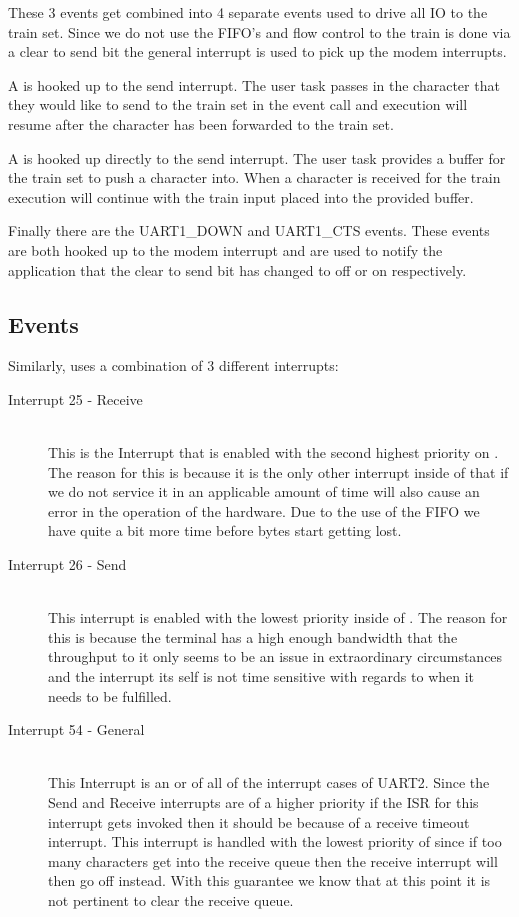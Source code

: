 \documentclass[pdftex,10pt,a4paper]{article}
\begin{document}
These 3 events get combined into 4 separate events used to drive all IO to the
train set. Since we do not use the FIFO's and flow control to the train is done
via a clear to send bit the general interrupt is used to pick up the modem
interrupts.

A  is hooked up to the  send interrupt. The user
task passes in the character that they would like to send to the train set
in the event call and execution will resume after the character has been
forwarded to the train set.

A  is hooked up directly to the  send interrupt.
The user task provides a buffer for the train set to push a character into.
When a character is received for the train execution will continue with the
train input placed into the provided buffer.

Finally there are the {UART1\_DOWN} and {UART1\_CTS} events. These events
are both hooked up to the  modem interrupt and are used to notify
the application that the clear to send bit has changed to off or on
respectively.

\subsection*{ Events}
Similarly,  uses a combination of 3 different interrupts:
\begin{description}
\item[Interrupt 25 -  Receive] \hfill \\
	This is the Interrupt that is enabled with the second highest priority
	on . The reason for this is because it is the only other
	interrupt inside of  that if we do not service it in an
	applicable amount of time will also cause an error in the operation of
	the hardware. Due to the use of the FIFO we have quite a bit more time
	before bytes start getting lost.
\item[Interrupt 26 -  Send] \hfill \\
	This interrupt is enabled with the lowest priority inside of
	. The reason for this is because the terminal has a high
	enough bandwidth that the throughput to it only seems to be an issue
	in extraordinary circumstances and the interrupt its self is not time
	sensitive with regards to when it needs to be fulfilled.
\item[Interrupt 54 -  General] \hfill \\
	This Interrupt is an or of all of the interrupt cases of UART2.
	Since the  Send and Receive interrupts are of a higher
	priority if the ISR for this interrupt gets invoked then it should
	be because of a receive timeout interrupt. This interrupt is handled
	with the lowest priority of  since if too many characters
	get into the receive queue then the  receive interrupt
	will then go off instead. With this guarantee we know that at this
	point it is not pertinent to clear the receive queue.
\end{description}
\end{document}
